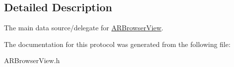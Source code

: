 \subsection{\-Detailed \-Description}
\-The main data source/delegate for \hyperlink{interface_a_r_browser_view}{\-A\-R\-Browser\-View}. 

\-The documentation for this protocol was generated from the following file\-:\begin{DoxyCompactItemize}
\item 
\-A\-R\-Browser\-View.\-h\end{DoxyCompactItemize}
